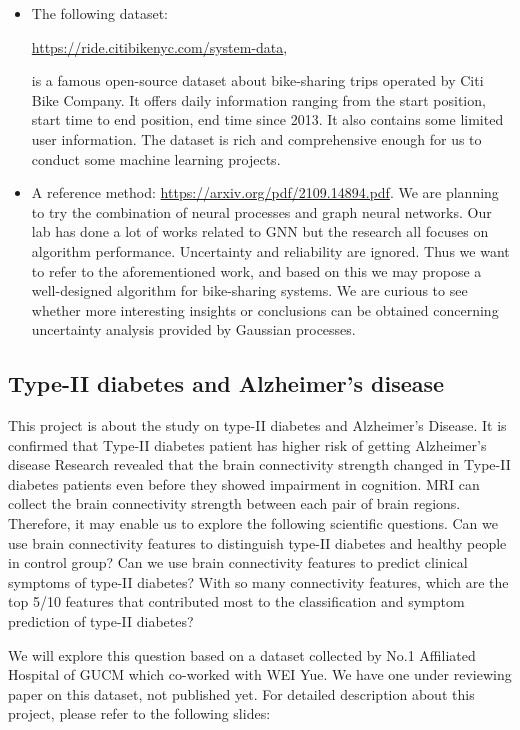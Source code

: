 \documentclass[11pt]{article}
\begin{document}
\begin{itemize}
\item The following dataset: 
\begin{center}
\url{https://ride.citibikenyc.com/system-data},
\end{center}
\noindent is a famous open-source dataset about bike-sharing trips operated by Citi Bike Company. It offers daily information ranging from the start position, start time to end position, end time since 2013. It also contains some limited user information. The dataset is rich and comprehensive enough for us to conduct some machine learning projects.

\item A reference method: \url{https://arxiv.org/pdf/2109.14894.pdf}. We are planning to try the combination of neural processes and graph neural networks. Our lab has done a lot of works related to GNN but the research all focuses on algorithm performance. Uncertainty and reliability are ignored. Thus we want to refer to the aforementioned work, and based on this we may propose a well-designed algorithm for bike-sharing systems. We are curious to see whether more interesting insights or conclusions can be obtained concerning uncertainty analysis provided by Gaussian processes.
\end{itemize}

\subsection{Type-II diabetes and Alzheimer's disease}

This project is about the study on type-II diabetes and Alzheimer's Disease. It is confirmed that Type-II diabetes patient has higher risk of getting Alzheimer's disease
Research revealed that the brain connectivity strength changed in Type-II diabetes patients even before they showed impairment in cognition. MRI can collect the brain connectivity strength between each pair of brain regions. Therefore, it may enable us to explore the following scientific questions. Can we use brain connectivity features to distinguish type-II diabetes and healthy people in control group? Can we use brain connectivity features to predict clinical symptoms of type-II diabetes? With so many connectivity features, which are the top 5/10 features that contributed most to the classification and symptom prediction of type-II diabetes?

We will explore this question based on a dataset collected by No.1 Affiliated Hospital of GUCM which co-worked with WEI Yue. We have one under reviewing paper on this dataset, not published yet. For detailed description about this project, please refer to the following slides:
\end{document}

